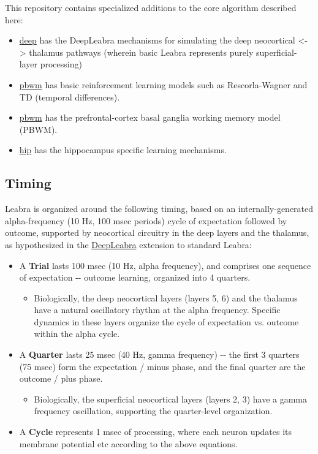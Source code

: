 This repository contains specialized additions to the core algorithm
described here:

\begin{itemize}
\tightlist
\item
  \href{https://github.com/emer/leabra/blob/master/deep}{deep} has the
  DeepLeabra mechanisms for simulating the deep neocortical
  \textless-\textgreater{} thalamus pathways (wherein basic Leabra
  represents purely superficial-layer processing)
\item
  \href{https://github.com/emer/leabra/blob/master/rl}{pbwm} has basic
  reinforcement learning models such as Rescorla-Wagner and TD (temporal
  differences).
\item
  \href{https://github.com/emer/leabra/blob/master/pbwm1}{pbwm} has the
  prefrontal-cortex basal ganglia working memory model (PBWM).
\item
  \href{https://github.com/emer/leabra/blob/master/hip}{hip} has the
  hippocampus specific learning mechanisms.
\end{itemize}

\hypertarget{timing}{%
\subsection{Timing}\label{timing}}

Leabra is organized around the following timing, based on an
internally-generated alpha-frequency (10 Hz, 100 msec periods) cycle of
expectation followed by outcome, supported by neocortical circuitry in
the deep layers and the thalamus, as hypothesized in the
\protect\hyperlink{deepleabra}{DeepLeabra} extension to standard Leabra:

\begin{itemize}
\item
  A \textbf{Trial} lasts 100 msec (10 Hz, alpha frequency), and
  comprises one sequence of expectation -\/- outcome learning, organized
  into 4 quarters.

  \begin{itemize}
  \tightlist
  \item
    Biologically, the deep neocortical layers (layers 5, 6) and the
    thalamus have a natural oscillatory rhythm at the alpha frequency.
    Specific dynamics in these layers organize the cycle of expectation
    vs. outcome within the alpha cycle.
  \end{itemize}
\item
  A \textbf{Quarter} lasts 25 msec (40 Hz, gamma frequency) -\/- the
  first 3 quarters (75 msec) form the expectation / minus phase, and the
  final quarter are the outcome / plus phase.

  \begin{itemize}
  \tightlist
  \item
    Biologically, the superficial neocortical layers (layers 2, 3) have
    a gamma frequency oscillation, supporting the quarter-level
    organization.
  \end{itemize}
\item
  A \textbf{Cycle} represents 1 msec of processing, where each neuron
  updates its membrane potential etc according to the above equations.
\end{itemize}

